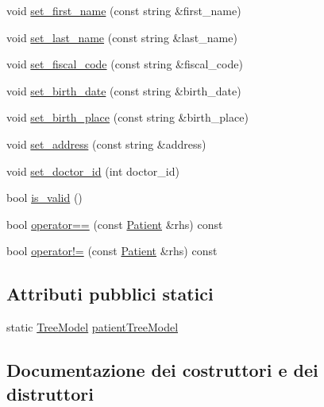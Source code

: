 \begin{DoxyCompactItemize}
\item 
void \hyperlink{classmm_1_1model_1_1_patient_a8b8dd8c6de5963a717cf192ca10c605e}{set\+\_\+first\+\_\+name} (const string \&first\+\_\+name)
\item 
void \hyperlink{classmm_1_1model_1_1_patient_a4883fc926a6693a2a6fd2b50ab2ded0e}{set\+\_\+last\+\_\+name} (const string \&last\+\_\+name)
\item 
void \hyperlink{classmm_1_1model_1_1_patient_a45485e586eb4a908ed4c7a51059fc131}{set\+\_\+fiscal\+\_\+code} (const string \&fiscal\+\_\+code)
\item 
void \hyperlink{classmm_1_1model_1_1_patient_ad73008977024e6ca48e5c687eb27b996}{set\+\_\+birth\+\_\+date} (const string \&birth\+\_\+date)
\item 
void \hyperlink{classmm_1_1model_1_1_patient_a6dc732f738425cc729764fdf16d667f0}{set\+\_\+birth\+\_\+place} (const string \&birth\+\_\+place)
\item 
void \hyperlink{classmm_1_1model_1_1_patient_a4e19f86233b55b4dec59f947f1dfe32a}{set\+\_\+address} (const string \&address)
\item 
void \hyperlink{classmm_1_1model_1_1_patient_a9dda6ce10296ab196cd5681b8e9a1091}{set\+\_\+doctor\+\_\+id} (int doctor\+\_\+id)
\item 
bool \hyperlink{classmm_1_1model_1_1_patient_a5f9da3f880ef1adc4bc5443ea407f48f}{is\+\_\+valid} ()
\item 
bool \hyperlink{classmm_1_1model_1_1_patient_a69367747ebc66b1b4e2fdf961811d83d}{operator==} (const \hyperlink{classmm_1_1model_1_1_patient}{Patient} \&rhs) const
\item 
bool \hyperlink{classmm_1_1model_1_1_patient_a96fe68d415c82b084ca75e87aefe8314}{operator!=} (const \hyperlink{classmm_1_1model_1_1_patient}{Patient} \&rhs) const
\end{DoxyCompactItemize}
\subsection*{Attributi pubblici statici}
\begin{DoxyCompactItemize}
\item 
static \hyperlink{structmm_1_1model_1_1_patient_1_1_tree_model}{Tree\+Model} \hyperlink{classmm_1_1model_1_1_patient_af2fe625b7bf2e3308df51daaff966281}{patient\+Tree\+Model}
\end{DoxyCompactItemize}


\subsection{Documentazione dei costruttori e dei distruttori}
\mbox{\label{classmm_1_1model_1_1_patient_ad15758bdb4995cf5f0b2830eef2b4b43}} 
